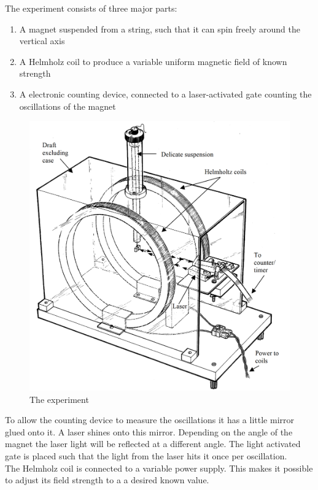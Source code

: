 \documentclass[14pt]{article}
\begin{document}
The experiment consists of three major parts:
\begin{enumerate}
  \item A magnet suspended from a string, such that it can spin freely around the vertical axis
  \item A Helmholz coil to produce a variable uniform magnetic field of known strength
  \item A electronic counting device, connected to a laser-activated gate counting the oscillations of the magnet
\end{enumerate}

\begin{figure}[H]
  \includegraphics[width=16cm]{images/experimental-setup.png}
  \caption{The experiment\cite{unknown}}
  \label{fig:figure1}
  \end{figure}

To allow the counting device to measure the oscillations it has a little mirror glued onto it. A laser shines onto this
mirror. Depending on the angle of the magnet the laser light will be reflected at a different angle. The light activated
gate is placed such that the light from the laser hits it once per oscillation. \\

The Helmholz coil is connected to a variable power supply. This makes it possible to adjust its field strength to a
a desired known value.
\end{document}
